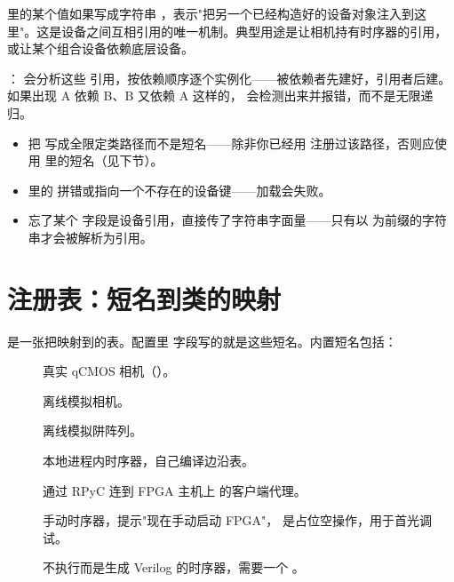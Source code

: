\documentclass[11pt,oneside,openany]{book}
\begin{document}
 里的某个值如果写成字符串 ，表示"把另一个已经构造好的设备对象注入到这里"。这是设备之间互相引用的唯一机制。典型用途是让相机持有时序器的引用，或让某个组合设备依赖底层设备。


： 会分析这些  引用，按依赖顺序逐个实例化——被依赖者先建好，引用者后建。如果出现 A 依赖 B、B 又依赖 A 这样的， 会检测出来并报错，而不是无限递归。

\begin{notebox}[常见错误]
\begin{itemize}
\item 把  写成全限定类路径而不是短名——除非你已经用  注册过该路径，否则应使用  里的短名（见下节）。
\item {} 里的  拼错或指向一个不存在的设备键——加载会失败。
\item 忘了某个  字段是设备引用，直接传了字符串字面量——只有以  为前缀的字符串才会被解析为引用。
\end{itemize}
\end{notebox}

\section{注册表：短名到类的映射}

 是一张把映射到的表。配置里  字段写的就是这些短名。内置短名包括：

\begin{description}
\item[] 真实 qCMOS 相机（）。
\item[] 离线模拟相机。
\item[] 离线模拟阱阵列。
\item[] 本地进程内时序器，自己编译边沿表。
\item[] 通过 RPyC 连到 FPGA 主机上  的客户端代理。
\item[] 手动时序器，提示"现在手动启动 FPGA"， 是占位空操作，用于首光调试。
\item[] 不执行而是生成 Verilog 的时序器，需要一个 。
\end{description}
\end{document}
